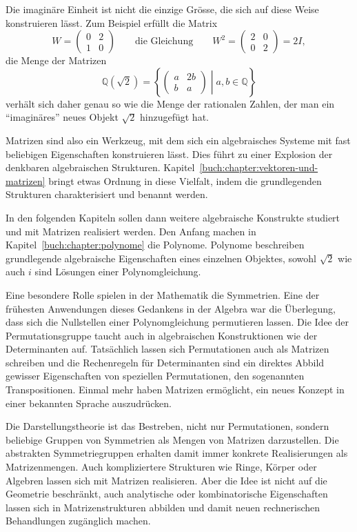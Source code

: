 Die imaginäre Einheit ist nicht die einzige Grösse, die sich auf diese
Weise konstruieren lässt.
Zum Beispiel erfüllt die Matrix
\[
W=\begin{pmatrix} 0&2\\1&0 \end{pmatrix}
\qquad\text{die Gleichung}\qquad
W^2 = \begin{pmatrix} 2&0\\0&2\end{pmatrix} = 2I,
\]
die Menge der Matrizen
\[
\mathbb{Q}(\!\sqrt{2})
=
\left\{\left.
\begin{pmatrix} a&2b\\ b&a\end{pmatrix}
\;\right|\;
a,b\in\mathbb{Q}
\right\}
\]
verhält sich daher genau so wie die Menge der rationalen Zahlen, der
man ein ``imaginäres'' neues Objekt $\!\sqrt{2}$ hinzugefügt hat.

Matrizen sind also ein Werkzeug, mit dem sich ein algebraisches Systeme
mit fast beliebigen Eigenschaften konstruieren lässt.
Dies führt zu einer Explosion der denkbaren algebraischen Strukturen.
Kapitel~\ref{buch:chapter:vektoren-und-matrizen} bringt etwas Ordnung
in diese Vielfalt, indem die grundlegenden Strukturen charakterisiert
und benannt werden.

In den folgenden Kapiteln sollen dann weitere algebraische Konstrukte
studiert und mit Matrizen realisiert werden.
Den Anfang machen in Kapitel~\ref{buch:chapter:polynome} die Polynome.
Polynome beschreiben grundlegende algebraische Eigenschaften eines
einzelnen Objektes, sowohl $\sqrt{2}$ wie auch $i$ sind Lösungen einer
Polynomgleichung.

Eine besondere Rolle spielen in der Mathematik die Symmetrien.
%
Eine der frühesten Anwendungen dieses Gedankens in der Algebra war
die Überlegung, dass sich die Nullstellen einer Polynomgleichung
permutieren lassen.
Die Idee der Permutationsgruppe taucht auch in algebraischen Konstruktionen
wie der Determinanten auf.
%
%
%
Tatsächlich lassen sich Permutationen auch als Matrizen schreiben
und die Rechenregeln für Determinanten sind ein direktes Abbild
gewisser Eigenschaften von speziellen Permutationen, den sogenannten
Transpositionen.
%
Einmal mehr haben Matrizen ermöglicht, ein neues Konzept in einer
bekannten Sprache auszudrücken.

Die Darstellungstheorie ist das Bestreben, nicht nur Permutationen,
%
sondern beliebige Gruppen von Symmetrien als Mengen von Matrizen
darzustellen.
Die abstrakten Symmetriegruppen erhalten damit immer konkrete 
Realisierungen als Matrizenmengen.
Auch kompliziertere Strukturen wie Ringe, Körper oder Algebren
lassen sich mit Matrizen realisieren.
%
%
%
Aber die Idee ist nicht auf die Geometrie beschränkt, auch analytische
oder kombinatorische Eigenschaften lassen sich in Matrizenstrukturen
abbilden und damit neuen rechnerischen Behandlungen zugänglich
machen.

